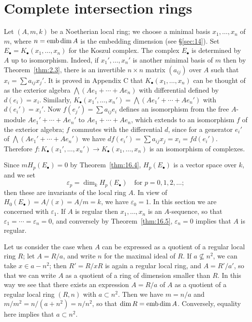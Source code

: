 \section{Complete intersection rings}\label{sec:21}

Let $(A, m, k)$ be a Noetherian local ring; we choose a minimal basis
$x_1, \ldots, x_n$ of $m$, where $n = \operatorname{emb\,dim} A$ is the embedding dimension (see
\S\ref{sec:14}). Set $E_\bullet = K_\bullet(x_1, \ldots, x_n)$ for the Koszul complex. The complex $E_\bullet$ is
determined by $A$ up to isomorphism. Indeed, if $x_1', \ldots, x_n'$ is another
minimal basis of $m$ then by Theorem~\ref{thm:2.3}, there is an invertible $n \times n$
matrix $(a_{ij})$ over $A$ such that $x_i = \sum a_{ij}x_j'$. It is proved in Appendix C that
$K_\bullet(x_1, \ldots, x_n)$ can be thought of as the exterior algebra $\bigwedge(Ae_1 + \cdots + Ae_n)$ with
differential defined by $d(e_i) = x_i$. Similarly,
$K_\bullet(x_1', \ldots, x_n') = \bigwedge(Ae_1' + \cdots + Ae_n')$ with $d(e_i') = x_i'$.
Now $f(e_j') = \sum a_{ij}e_i$ defines an isomorphism from the free $A$-module
$Ae_1' + \cdots + Ae_n'$ to $Ae_1 + \cdots + Ae_n$, which extends to an isomorphism $f$
of the exterior algebra; $f$ commutes with the differential $d$, since for a
generator $e_i'$ of $\bigwedge(Ae_1' + \cdots + Ae_n')$ we have $df(e_i') = \sum a_{ij}x_j = x_i = fd(e_i')$.
Therefore $f\colon K_\bullet(x_1', \ldots, x_n') \to K_\bullet(x_1, \ldots, x_n)$ is an isomorphism of complexes.

Since $mH_p(E_\bullet) = 0$ by Theorem~\ref{thm:16.4}, $H_p(E_\bullet)$ is a vector space over
$k$, and we set
\[
  \varepsilon_p = \dim_k H_p(E_\bullet) \quad \text{for } p = 0, 1, 2, \ldots;
\]
then these are invariants of the local ring $A$. In view of $H_0(E_\bullet) = A/(x) =
A/m = k$, we have $\varepsilon_0 = 1$. In this section we are concerned with $\varepsilon_1$. If $A$ is
regular then $x_1, \ldots, x_n$ is an $A$-sequence, so that $\varepsilon_1 = \cdots = \varepsilon_n = 0$, and
conversely by Theorem~\ref{thm:16.5}, $\varepsilon_n = 0$ implies that $A$ is regular.

Let us consider the case when $A$ can be expressed as a quotient of a
regular local ring $R$; let $A = R/a$, and write $n$ for the maximal ideal of $R$.
If $a \nsubseteq n^2$, we can take $x \in a - n^2$; then $R' = R/xR$ is again a regular local
ring, and $A = R'/a'$, so that we can write $A$ as a quotient of a ring of
dimension smaller than $R$. In this way we see that there exists an
expression $A = R/a$ of $A$ as a quotient of a regular local ring $(R, n)$ with
$a \subset n^2$. Then we have $m = n/a$ and $m/m^2 = n/(a + n^2) = n/n^2$, so that
$\dim R = \operatorname{emb\,dim} A$. Conversely, equality here implies that $a \subset n^2$.

